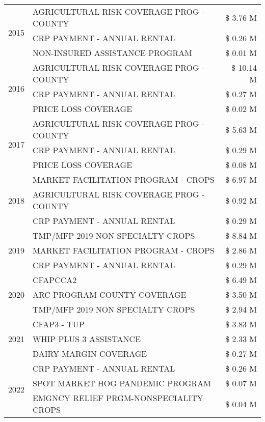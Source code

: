 \begin{tabular}{llr}
\cline{1-3}
\multirow[t]{3}{*}{2015} & AGRICULTURAL RISK COVERAGE PROG - COUNTY & \$ 3.76 M \\
 & CRP PAYMENT - ANNUAL RENTAL & \$ 0.26 M \\
 & NON-INSURED ASSISTANCE PROGRAM & \$ 0.01 M \\
\cline{1-3}
\multirow[t]{3}{*}{2016} & AGRICULTURAL RISK COVERAGE PROG - COUNTY & \$ 10.14 M \\
 & CRP PAYMENT - ANNUAL RENTAL & \$ 0.27 M \\
 & PRICE LOSS COVERAGE & \$ 0.02 M \\
\cline{1-3}
\multirow[t]{3}{*}{2017} & AGRICULTURAL RISK COVERAGE PROG - COUNTY & \$ 5.63 M \\
 & CRP PAYMENT - ANNUAL RENTAL & \$ 0.29 M \\
 & PRICE LOSS COVERAGE & \$ 0.08 M \\
\cline{1-3}
\multirow[t]{3}{*}{2018} & MARKET FACILITATION PROGRAM - CROPS & \$ 6.97 M \\
 & AGRICULTURAL RISK COVERAGE PROG - COUNTY & \$ 0.92 M \\
 & CRP PAYMENT - ANNUAL RENTAL & \$ 0.29 M \\
\cline{1-3}
\multirow[t]{3}{*}{2019} & TMP/MFP 2019 NON SPECIALTY CROPS & \$ 8.84 M \\
 & MARKET FACILITATION PROGRAM - CROPS & \$ 2.86 M \\
 & CRP PAYMENT - ANNUAL RENTAL & \$ 0.29 M \\
\cline{1-3}
\multirow[t]{3}{*}{2020} & CFAPCCA2 & \$ 6.49 M \\
 & ARC PROGRAM-COUNTY COVERAGE & \$ 3.50 M \\
 & TMP/MFP 2019 NON SPECIALTY CROPS & \$ 2.94 M \\
\cline{1-3}
\multirow[t]{3}{*}{2021} & CFAP3 - TUP & \$ 3.83 M \\
 & WHIP PLUS 3 ASSISTANCE & \$ 2.33 M \\
 & DAIRY MARGIN COVERAGE & \$ 0.27 M \\
\cline{1-3}
\multirow[t]{3}{*}{2022} & CRP PAYMENT - ANNUAL RENTAL & \$ 0.26 M \\
 & SPOT MARKET HOG PANDEMIC PROGRAM & \$ 0.07 M \\
 & EMGNCY RELIEF PRGM-NONSPECIALITY CROPS & \$ 0.04 M \\
\cline{1-3}
\bottomrule
\end{tabular}
